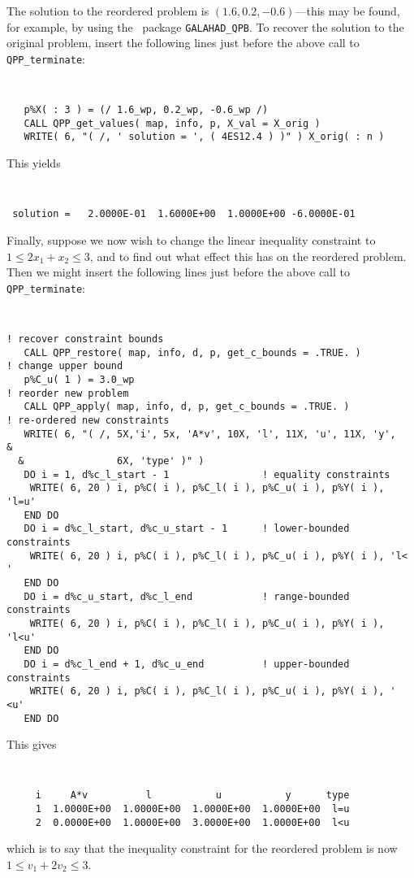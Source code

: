 \documentclass{galahad}
\newcommand{\packagename}{QPP}
\begin{document}
The solution to the reordered problem is $(1.6, 0.2, -0.6)$---this may 
be found, for example, by using 
the \galahad\ package {\tt GALAHAD\_QPB}. To recover the solution to the 
original problem, insert the following lines just before the 
above call to {\tt \packagename\_terminate}: 
{\tt \small
\begin{verbatim}
   p%X( : 3 ) = (/ 1.6_wp, 0.2_wp, -0.6_wp /)
   CALL QPP_get_values( map, info, p, X_val = X_orig )
   WRITE( 6, "( /, ' solution = ', ( 4ES12.4 ) )" ) X_orig( : n )
\end{verbatim}
}
\noindent
This yields 
{\tt \small
\begin{verbatim}
 solution =   2.0000E-01  1.6000E+00  1.0000E+00 -6.0000E-01
\end{verbatim}
}
\noindent
Finally, suppose we now wish to change the linear 
inequality constraint to $1 \leq 2 x_1 + x_2 \leq 3$, and 
to find out what effect this has on the reordered problem. Then 
we might insert the following lines just before the 
above call to {\tt \packagename\_terminate}: 
{\tt \small
\begin{verbatim}
! recover constraint bounds
   CALL QPP_restore( map, info, d, p, get_c_bounds = .TRUE. )
! change upper bound
   p%C_u( 1 ) = 3.0_wp
! reorder new problem
   CALL QPP_apply( map, info, d, p, get_c_bounds = .TRUE. ) 
! re-ordered new constraints
   WRITE( 6, "( /, 5X,'i', 5x, 'A*v', 10X, 'l', 11X, 'u', 11X, 'y',            &
  &                6X, 'type' )" )
   DO i = 1, d%c_l_start - 1                ! equality constraints
    WRITE( 6, 20 ) i, p%C( i ), p%C_l( i ), p%C_u( i ), p%Y( i ), 'l=u'
   END DO
   DO i = d%c_l_start, d%c_u_start - 1      ! lower-bounded constraints
    WRITE( 6, 20 ) i, p%C( i ), p%C_l( i ), p%C_u( i ), p%Y( i ), 'l< '
   END DO
   DO i = d%c_u_start, d%c_l_end            ! range-bounded constraints
    WRITE( 6, 20 ) i, p%C( i ), p%C_l( i ), p%C_u( i ), p%Y( i ), 'l<u'
   END DO
   DO i = d%c_l_end + 1, d%c_u_end          ! upper-bounded constraints
    WRITE( 6, 20 ) i, p%C( i ), p%C_l( i ), p%C_u( i ), p%Y( i ), ' <u'
   END DO
\end{verbatim}
}
\noindent
This gives 
{\tt \small
\begin{verbatim}
     i     A*v          l           u           y      type
     1  1.0000E+00  1.0000E+00  1.0000E+00  1.0000E+00  l=u
     2  0.0000E+00  1.0000E+00  3.0000E+00  1.0000E+00  l<u
\end{verbatim}
}
\noindent
which is to say that the inequality constraint for the reordered problem is now 
$1 \leq v_1 + 2 v_2 \leq 3$. 
\end{document}
